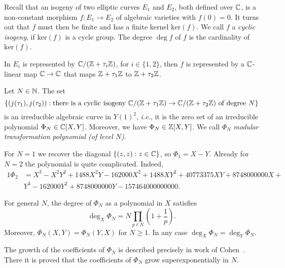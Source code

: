 Recall that an isogeny of two elliptic curves $E_1$ and $E_2$, both
defined over ${\mathbb{C}}$, is a non-constant morphism $f\colon E_1\rightarrow
E_2$ of algebraic varieties with $f(0)=0$. It turns out that $f$ must
then be finite and has a finite kernel $\mathrm{ker}(f)$.
We call $f$ a \emph{cyclic isogeny}, if $\mathrm{ker}(f)$ is a cycle
group. The degree $\deg f$ of $f$ is the cardinality of $\mathrm{ker}(f)$. 

In $E_i$ is represented by ${\mathbb{C}}/({\mathbb{Z}}+\tau_i{\mathbb{Z}})$, for $i\in \{1,2\}$,
then $f$ is represented by a ${\mathbb{C}}$-linear map ${\mathbb{C}}\rightarrow{\mathbb{C}}$ that
maps ${\mathbb{Z}}+\tau_1{\mathbb{Z}}$ to ${\mathbb{Z}}+\tau_2{\mathbb{Z}}$.

\begin{deflemma}
  \label{deflem:modtranspoly}
  Let $N\in{\mathbb{N}}$. The set
  \begin{equation*}
    \left\{ (j(\tau_1),j(\tau_2)) : \text{there is a cyclic isogeny 
        ${\mathbb{C}}/({\mathbb{Z}}+\tau_1{\mathbb{Z}})\rightarrow {\mathbb{C}}/({\mathbb{Z}}+\tau_2{\mathbb{Z}})$ of degree $N$}\right\}
  \end{equation*}
  is an irreducible algebraic curve in $Y(1)^2$, \textit{i.e.}, it is
  the zero set of an irreducible polynomial $\Phi_N\in{\mathbb{C}}[X,Y]$.
  Moreover, we have $\Phi_N\in{\mathbb{Z}}[X,Y]$. We call $\Phi_N$
  \emph{modular transformation polynomial (of level $N$)}.
\end{deflemma}

\begin{example}
  For $N=1$ we recover the diagonal $\{(z,z) : z\in{\mathbb{C}}\}$, so $\Phi_1
  = X-Y$. 
  Already for $N=2$ the polynomial is quite complicated. Indeed,
  \begin{alignat*}1
    \Phi_2 &= 
    X^3 - X^2Y^2 + 1488X^2Y - 162000X^2 + 1488XY^2+ 40773375XY +
    8748000000X + \\
    &Y^3 - 162000Y^2 + 8748000000Y -157464000000000.    
  \end{alignat*}

  For general $N$, the degree of $\Phi_N$ as a polynomial in $X$
  satisfies
  \begin{equation*}
    \deg_X \Phi_N = N\prod_{p\ell N}\left(1+\frac 1p\right). 
  \end{equation*}
  Moreover, $\Phi_N(X,Y) = \Phi_N(Y,X)$ for $N\ge 1$. In any case
  $\deg_X \Phi_N = \deg_Y \Phi_N$.

  The growth of the coefficients of $\Phi_N$ is described precisely in
  work of Cohen~\cite{Cohen}. There it is proved that the
  coefficients of $\Phi_N$ grow superexponentially in $N$. 
\end{example}

